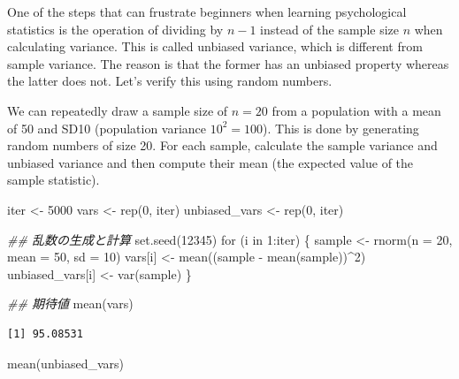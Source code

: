 \documentclass[
  a4paper,
]{book}
\newenvironment{Shaded}{\begin{snugshade}}{\end{snugshade}}
\newcommand{\AttributeTok}[1]{\textcolor[rgb]{0.40,0.45,0.13}{#1}}
\newcommand{\ControlFlowTok}[1]{\textcolor[rgb]{0.00,0.23,0.31}{#1}}
\newcommand{\DecValTok}[1]{\textcolor[rgb]{0.68,0.00,0.00}{#1}}
\newcommand{\DocumentationTok}[1]{\textcolor[rgb]{0.37,0.37,0.37}{\textit{#1}}}
\newcommand{\FunctionTok}[1]{\textcolor[rgb]{0.28,0.35,0.67}{#1}}
\newcommand{\NormalTok}[1]{\textcolor[rgb]{0.00,0.23,0.31}{#1}}
\newcommand{\OtherTok}[1]{\textcolor[rgb]{0.00,0.23,0.31}{#1}}
\newcommand{\SpecialCharTok}[1]{\textcolor[rgb]{0.37,0.37,0.37}{#1}}
\begin{document}
One of the steps that can frustrate beginners when learning
psychological statistics is the operation of dividing by \(n-1\) instead
of the sample size \(n\) when calculating variance. This is called
unbiased variance, which is different from sample variance. The reason
is that the former has an unbiased property whereas the latter does not.
Let's verify this using random numbers.

We can repeatedly draw a sample size of \(n=20\) from a population with
a mean of 50 and SD10 (population variance \(10^2=100\)). This is done
by generating random numbers of size 20. For each sample, calculate the
sample variance and unbiased variance and then compute their mean (the
expected value of the sample statistic).

\begin{Shaded}
\begin{Highlighting}[]
\NormalTok{iter }\OtherTok{\textless{}{-}} \DecValTok{5000}
\NormalTok{vars }\OtherTok{\textless{}{-}} \FunctionTok{rep}\NormalTok{(}\DecValTok{0}\NormalTok{, iter)}
\NormalTok{unbiased\_vars }\OtherTok{\textless{}{-}} \FunctionTok{rep}\NormalTok{(}\DecValTok{0}\NormalTok{, iter)}

\DocumentationTok{\#\# 乱数の生成と計算}
\FunctionTok{set.seed}\NormalTok{(}\DecValTok{12345}\NormalTok{)}
\ControlFlowTok{for}\NormalTok{ (i }\ControlFlowTok{in} \DecValTok{1}\SpecialCharTok{:}\NormalTok{iter) \{}
\NormalTok{  sample }\OtherTok{\textless{}{-}} \FunctionTok{rnorm}\NormalTok{(}\AttributeTok{n =} \DecValTok{20}\NormalTok{, }\AttributeTok{mean =} \DecValTok{50}\NormalTok{, }\AttributeTok{sd =} \DecValTok{10}\NormalTok{)}
\NormalTok{  vars[i] }\OtherTok{\textless{}{-}} \FunctionTok{mean}\NormalTok{((sample }\SpecialCharTok{{-}} \FunctionTok{mean}\NormalTok{(sample))}\SpecialCharTok{\^{}}\DecValTok{2}\NormalTok{)}
\NormalTok{  unbiased\_vars[i] }\OtherTok{\textless{}{-}} \FunctionTok{var}\NormalTok{(sample)}
\NormalTok{\}}

\DocumentationTok{\#\# 期待値}
\FunctionTok{mean}\NormalTok{(vars)}
\end{Highlighting}
\end{Shaded}

\begin{verbatim}
[1] 95.08531
\end{verbatim}

\begin{Shaded}
\begin{Highlighting}[]
\FunctionTok{mean}\NormalTok{(unbiased\_vars)}
\end{Highlighting}
\end{Shaded}
\end{document}
